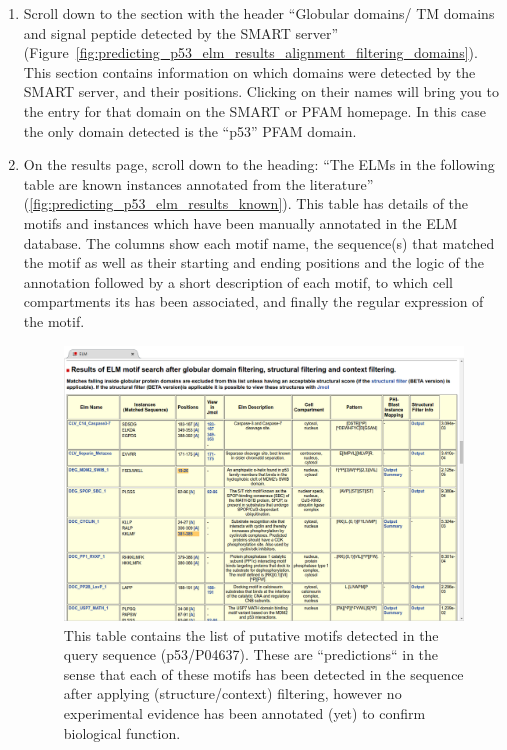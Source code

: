 \documentclass[12pt]{article}
\begin{document}
\begin{enumerate}
\item Scroll down to the section with the header ``Globular domains/ TM domains
	and signal peptide detected by the SMART server''
	(Figure~\ref{fig:predicting_p53_elm_results_alignment_filtering_domains}).
	This section contains information on which domains were detected by the
	SMART server, and their positions. Clicking on their names will bring
	you to the entry for that domain on the SMART or PFAM homepage.
	In this case the only domain detected is the ``p53'' PFAM domain.

\item On the results page, scroll down to the heading: ``The ELMs in the
	following table are known instances annotated from the literature''
	(\ref{fig:predicting_p53_elm_results_known}).
	This table has details of the motifs and instances which have been
	manually annotated in the ELM database. The columns show each motif
	name, the sequence(s) that matched the motif as well as their starting
	and ending positions and the logic of the annotation followed by a
	short description of each motif, to which cell compartments its has
	been associated, and finally the regular expression of the motif.

\begin{figure}[h!]
	\centering
	\includegraphics[width=\textwidth]{Figures/predicting_p53/elm_results_motifs.png}
	\caption{
	This table contains the list of putative motifs detected in the query
	sequence (p53/P04637). These are ``predictions`` in the sense that each
	of these motifs has been detected in the sequence after applying
	(structure/context) filtering, however no experimental evidence has been
	annotated (yet) to confirm biological function.
	}
	\label{fig:predicting_p53_elm_results_motifs}
\end{figure}


\end{enumerate}
\end{document}
